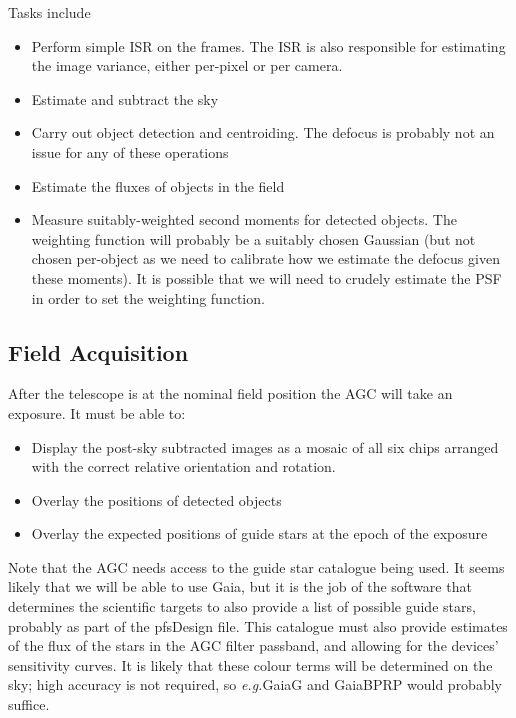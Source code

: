 \documentclass[12pt]{article}
\newcommand{\eg}{\textit{e.g.}\xspace}
\newcommand{\AGC}{\gls{AGC}\xspace}
\begin{document}
Tasks include
\begin{itemize}
  \item Perform simple \gls{ISR} on the frames.
    The \gls{ISR} is also responsible for estimating the image variance, either per-pixel or per camera.
  \item Estimate and subtract the sky
  \item Carry out object detection and centroiding.  The defocus
    is probably not an issue for any of these operations
  \item Estimate the fluxes of objects in the field
  \item Measure suitably-weighted second moments for detected objects. The weighting function
    will probably be a suitably chosen Gaussian (but not chosen per-object as we need to
    calibrate how we estimate the defocus given these moments). It is possible that we will
    need to crudely estimate the \gls{PSF} in order to set the weighting function.
\end{itemize}

\subsection{Field Acquisition}
\label{sec:FieldAcquisition}

After the telescope is at the nominal field position the \AGC will take an exposure.  It must
be able to:
\begin{itemize}
  \item Display the post-sky subtracted images as a mosaic of all six chips arranged
    with the correct relative orientation and rotation.
  \item Overlay the positions of detected objects
  \item Overlay the expected positions of guide stars at the epoch of the exposure
\end{itemize}

Note that the \AGC needs access to the guide star catalogue being used.  It seems likely that we will be able
to use \gls{Gaia}, but it is the job of the software that determines the scientific targets to also provide a
list of possible guide stars, probably as
part of the \gls{pfsDesign} file.  This catalogue must also provide estimates of the flux of the stars in the
\AGC filter passband, and allowing for the devices' sensitivity curves.  It is likely that these colour
terms will be determined on the sky; high accuracy is not required, so \eg \gls{GaiaG} and \gls{GaiaBPRP}
would probably suffice.
\end{document}
